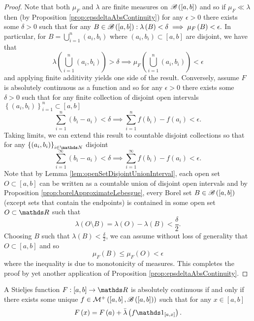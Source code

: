 \begin{proof}
Note that both $\mu_{F}$ and $\lambda$ are finite measures on $\mathscr{B}\left(\left[a,b\right]\right)$
and so if $\mu_{F}\ll\lambda$ then (by Proposition \ref{prop:epsdeltaAbsContinuity})
for any $\epsilon>0$ there exists some $\delta>0$ such that for
any $B\in\mathscr{B}\left(\left[a,b\right]\right):\lambda\left(B\right)<\delta\implies\mu_{F}\left(B\right)<\epsilon.$
In particular, for $B=\bigcup_{i=1}^{n}\left(a_{i},b_{i}\right)$
where $\left(a_{i},b_{i}\right)\subset\left[a,b\right]$ are disjoint,
we have that 
\[
\lambda\left(\bigcup_{i=1}^{n}\left(a_{i},b_{i}\right)\right)>\delta\implies\mu_{F}\left(\bigcup_{i=1}^{n}\left(a_{i},b_{i}\right)\right)<\epsilon
\]
and applying finite additivity yields one side of the result. Conversely,
assume $F$ is absolutely continuous as a function and so for any
$\epsilon>0$ there exists some $\delta>0$ such that for any finite
collection of disjoint open intervals $\left\{ \left(a_{i},b_{i}\right)\right\} _{i=1}^{n}\subset\left[a,b\right]$
\[
\sum_{i=1}^{n}\left(b_{i}-a_{i}\right)<\delta\implies\sum_{i=1}^{n}f\left(b_{i}\right)-f\left(a_{i}\right)<\epsilon.
\]
Taking limits, we can extend this result to countable disjoint collections
so that for any $\left\{ \left(a_{i},b_{i}\right)\right\} _{i\in\N}$
disjoint
\[
\sum_{i=1}^{\infty}\left(b_{i}-a_{i}\right)<\delta\implies\sum_{i=1}^{\infty}f\left(b_{i}\right)-f\left(a_{i}\right)<\epsilon.
\]
 Note that by Lemma \ref{lem:openSetDisjointUnionInterval}, each
open set $O\subset\left[a,b\right]$ can be written as a countable
union of disjoint open intervals and by Proposition \ref{prop:borelApproximateLebesgue},
every Borel set $B\in\mathscr{B}\left(\left[a,b\right]\right)$ (except
sets that contain the endpoints) is contained in some open set $O\subset\R$
such that 
\[
\lambda\left(O\setminus B\right)=\lambda\left(O\right)-\lambda\left(B\right)<\frac{\delta}{2}.
\]
Choosing $B$ such that $\lambda\left(B\right)<\frac{\delta}{2}$,
we can assume without loss of generality that $O\subset\left[a,b\right]$
and so 
\[
\mu_{F}\left(B\right)\leq\mu_{F}\left(O\right)<\epsilon
\]
where the inequality is due to monotonicity of measures. This completes
the proof by yet another application of Proposition \ref{prop:epsdeltaAbsContinuity}.
\end{proof}
\begin{cor}
\label{cor:stieljesAbsContRepresentation}A Stieljes function $F:\left[a,b\right]\to\R$
is absolutely continuous if and only if there exists some unique $f\in\mathcal{M}^{+}\left(\left[a,b\right],\mathscr{B}\left(\left[a,b\right]\right)\right)$
such that for any $x\in\left[a,b\right]$
\[
F\left(x\right)=F\left(a\right)+\lebInt{\lambda}{f\indicate_{\left[a,x\right]}}.
\]
\end{cor}

